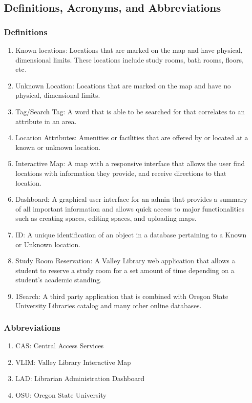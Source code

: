 \documentclass[letterpaper,10pt,titlepage, onecolumn, compsoc]{IEEEtran}
\begin{document}
\subsection{Definitions, Acronyms, and Abbreviations}

\subsubsection{Definitions}
\begin{enumerate}
	\item Known locations: Locations that are marked on the map and have physical, dimensional limits. These locations include study rooms, bath rooms, floors, etc. 
	\item Unknown Location: Locations that are marked on the map and have no physical, dimensional limits.
    \item Tag/Search Tag: A word that is able to be searched for that correlates to an attribute in an area. 
    \item Location Attributes: Amenities or facilities that are offered by or located at a known or unknown location. 
    \item Interactive Map: A map with a responsive interface that allows the user find locations with information they provide, and receive directions to that location. 
    \item Dashboard: A graphical user interface for an admin that provides a summary of all important information and allows quick access to major functionalities such as creating spaces, editing spaces, and uploading maps.
    \item ID: A unique identification of an object in a database pertaining to a Known or Unknown location.
    \item Study Room Reservation: A Valley Library web application that allows a student to reserve a study room for a set amount of time depending on a student's academic standing. 
    \item 1Search: A third party application that is combined with Oregon State University Libraries catalog and many other online databases.
\end{enumerate}


\subsubsection{Abbreviations}
\begin{enumerate}
	\item CAS: Central Access Services
    \item VLIM: Valley Library Interactive Map
    \item LAD: Librarian Administration Dashboard
    \item OSU: Oregon State University 
\end{enumerate}
\end{document}
